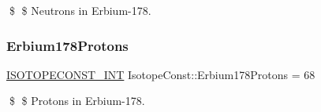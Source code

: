 \$ \$ Neutrons in Erbium-\/178. \mbox{\label{group___isotope_const-_erbium-_er178_ga8216403a5dc1ababd38ad54a1386c827}} 
\subsubsection{\texorpdfstring{Erbium178\+Protons}{Erbium178Protons}}
{\footnotesize\ttfamily \mbox{\hyperlink{group___isotope_const-_macros_ga5f18360b3e99483a35c32d789e62621c}{I\+S\+O\+T\+O\+P\+E\+C\+O\+N\+S\+T\+\_\+\+I\+NT}} Isotope\+Const\+::\+Erbium178\+Protons = 68}

\$ \$ Protons in Erbium-\/178. 